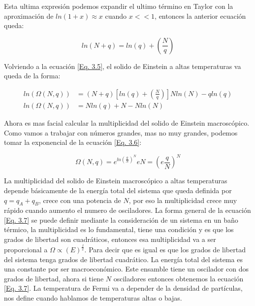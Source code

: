 \documentclass[11pt,fleqn]{book}
\begin{document}
Esta ultima expresión podemos expandir el ultimo término en Taylor con la aproximación de $ln(1+x)\approx x$ cuando $x<<1$, entonces la anterior ecuación queda:

\begin{equation*}
    ln(N+q)=ln(q)+\left(\frac{N}{q}\right)
\end{equation*}

Volviendo a la ecuación \ref{Eq. 3.5}, el solido de Einstein a altas temperaturas va queda de la forma:

\begin{equation}
    \begin{split}
    ln(\Omega(N,q))&=(N+q)\left[ln(q)+\left(\frac{N}{q}\right)\right]Nln(N)-qln(q)\\
    ln(\Omega(N,q))&=Nln(q)+N-Nln(N)
\end{split}
        \label{Eq. 3.6}
\end{equation}

Ahora es mas facial calcular la multiplicidad del solido de Einstein macroscópico. Como vamos a trabajar con números grandes, mas no muy grandes, podemos tomar la exponencial de la ecuación \ref{Eq. 3.6}:

\begin{equation}
    \Omega(N,q)= e^{ln\left(\frac{q}{N}\right)^{N}}e{N}=\left(e\frac{q}{N}\right)^{N}
    \label{Eq. 3.7}
\end{equation}

La multiplicidad del solido de Einstein macroscópico a altas temperaturas depende básicamente de la energía total del sistema que queda definida por $q=q_{A}+q_{B}$, crece con una potencia de $N$, por eso la multiplicidad crece muy rápido cuando aumento el numero de osciladores. La forma general de la ecuación \ref{Eq. 3.7} se puede definir mediante la consideración de un sistema en un baño térmico, la multiplicidad es lo fundamental, tiene una condición y es que los grados de libertad son cuadráticos, entonces esa multiplicidad va a ser proporcional a $\Omega\propto(E)^{\frac{f}{2}}$. Para decir que es igual es que los grados de libertad del sistema tenga grados de libertad cuadrático. La energía total del sistema es una constante por ser macroeconómico. Este ensamble tiene un oscilador con dos grados de libertad, ahora si tiene $N$ osciladores entonces obtenemos la ecuación \ref{Eq. 3.7}. La temperatura de Fermi va a depender de la densidad de partículas, nos define cuando hablamos de temperaturas altas o bajas. 


\end{document}
